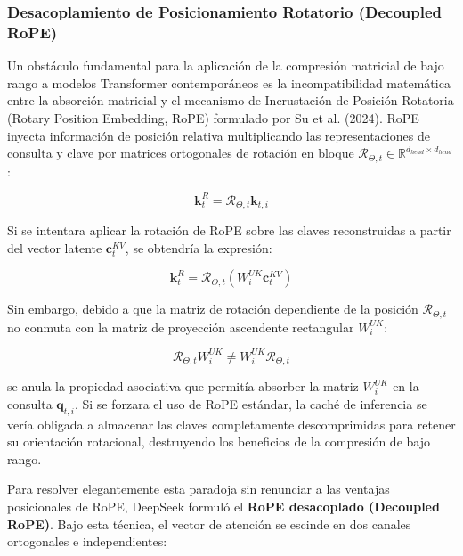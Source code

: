 \subsubsection{Desacoplamiento de Posicionamiento Rotatorio (Decoupled RoPE)}

Un obstáculo fundamental para la aplicación de la compresión matricial de bajo rango a modelos Transformer contemporáneos es la incompatibilidad matemática entre la absorción matricial y el mecanismo de Incrustación de Posición Rotatoria (Rotary Position Embedding, RoPE) formulado por Su et al. (2024). RoPE inyecta información de posición relativa multiplicando las representaciones de consulta y clave por matrices ortogonales de rotación en bloque $\mathcal{R}_{\Theta, t} \in \mathbb{R}^{d_{head} \times d_{head}}$:

\begin{equation}
\mathbf{k}_t^R = \mathcal{R}_{\Theta, t} \mathbf{k}_{t,i}
\end{equation}

Si se intentara aplicar la rotación de RoPE sobre las claves reconstruidas a partir del vector latente $\mathbf{c}_t^{KV}$, se obtendría la expresión:

\begin{equation}
\mathbf{k}_t^R = \mathcal{R}_{\Theta, t} \left( W^{UK}_i \mathbf{c}_t^{KV} \right)
\end{equation}

Sin embargo, debido a que la matriz de rotación dependiente de la posición $\mathcal{R}_{\Theta, t}$ no conmuta con la matriz de proyección ascendente rectangular $W^{UK}_i$:

\begin{equation}
\mathcal{R}_{\Theta, t} W^{UK}_i \neq W^{UK}_i \mathcal{R}_{\Theta, t}
\end{equation}

se anula la propiedad asociativa que permitía absorber la matriz $W^{UK}_i$ en la consulta $\mathbf{q}_{t,i}$. Si se forzara el uso de RoPE estándar, la caché de inferencia se vería obligada a almacenar las claves completamente descomprimidas para retener su orientación rotacional, destruyendo los beneficios de la compresión de bajo rango.

Para resolver elegantemente esta paradoja sin renunciar a las ventajas posicionales de RoPE, DeepSeek formuló el \textbf{RoPE desacoplado (Decoupled RoPE)}. Bajo esta técnica, el vector de atención se escinde en dos canales ortogonales e independientes:

